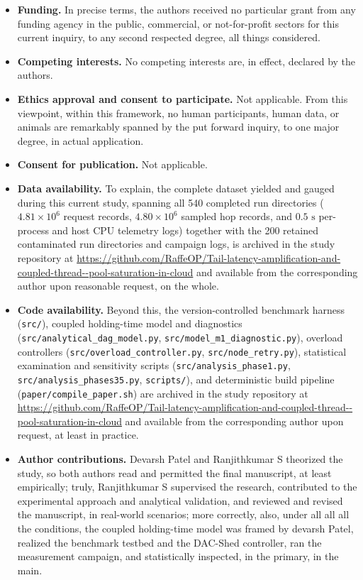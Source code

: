 \documentclass[pdflatex,sn-mathphys]{sn-jnl}
\begin{document}
\begin{itemize}
\item \textbf{Funding.} In precise terms, the authors received no particular grant from any funding agency in the public, commercial, or not-for-profit sectors for this current inquiry, to any second respected degree, all things considered.
\item \textbf{Competing interests.} No competing interests are, in effect, declared by the authors.
\item \textbf{Ethics approval and consent to participate.} Not applicable. From this viewpoint, within this framework, no human participants, human data, or animals are remarkably spanned by the put forward inquiry, to one major degree, in actual application.
\item \textbf{Consent for publication.} Not applicable.
\item \textbf{Data availability.} To explain, the complete dataset yielded and gauged during this current study, spanning all 540 completed run directories ($4.81 \times 10^6$ request records, $4.80 \times 10^6$ sampled hop records, and $0.5\text{ s}$ per-process and host CPU telemetry logs) together with the 200 retained contaminated run directories and campaign logs, is archived in the study repository at \url{https://github.com/RaffeOP/Tail-latency-amplification-and-coupled-thread--pool-saturation-in-cloud} and available from the corresponding author upon reasonable request, on the whole.
\item \textbf{Code availability.} Beyond this, the version-controlled benchmark harness (\texttt{src/}), coupled holding-time model and diagnostics (\texttt{src/analytical\_dag\_model.py}, \texttt{src/model\_m1\_diagnostic.py}), overload controllers (\texttt{src/overload\_controller.py}, \texttt{src/node\_retry.py}), statistical examination and sensitivity scripts (\texttt{src/analysis\_phase1.py}, \texttt{src/analysis\_phases35.py}, \texttt{scripts/}), and deterministic build pipeline (\texttt{paper/compile\_paper.sh}) are archived in the study repository at \url{https://github.com/RaffeOP/Tail-latency-amplification-and-coupled-thread--pool-saturation-in-cloud} and available from the corresponding author upon request, at least in practice.
\item \textbf{Author contributions.} Devarsh Patel and Ranjithkumar S theorized the study, so both authors read and permitted the final manuscript, at least empirically; truly, Ranjithkumar S supervised the research, contributed to the experimental approach and analytical validation, and reviewed and revised the manuscript, in real-world scenarios; more correctly, also, under all all all the conditions, the coupled holding-time model was framed by devarsh Patel, realized the benchmark testbed and the DAC-Shed controller, ran the measurement campaign, and statistically inspected, in the primary, in the main.
\end{itemize}


\end{document}
